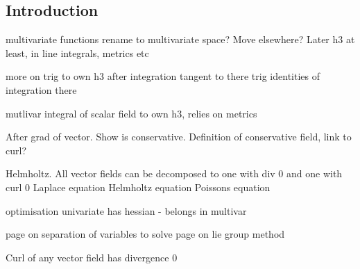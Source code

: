 
\subsection{Introduction}

multivariate functions rename to multivariate space? Move elsewhere? Later h3 at least, in line integrals, metrics etc

more on trig to own h3 after integration
	tangent to there
	trig identities of integration there

mutlivar integral of scalar field to own h3, relies on metrics

After grad of vector. Show is conservative. Definition of conservative field, link to curl?

Helmholtz. All vector fields can be decomposed to one with div 0 and one with curl 0
Laplace equation
Helmholtz equation
Poissons equation

optimisation univariate has hessian - belongs in multivar

page on separation of variables to solve
page on lie group method

Curl of any vector field has divergence 0

